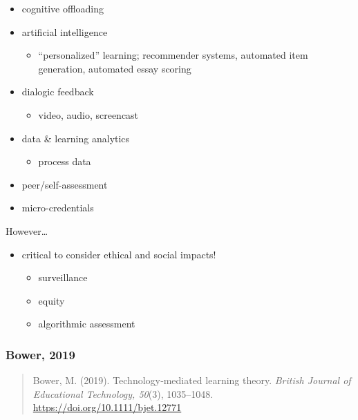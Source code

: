 \documentclass[
]{book}
\providecommand{\tightlist}{%
  \setlength{\itemsep}{0pt}\setlength{\parskip}{0pt}}
\begin{document}
\begin{itemize}
\tightlist
\item
  cognitive offloading\\
\item
  artificial intelligence

  \begin{itemize}
  \tightlist
  \item
    ``personalized'' learning; recommender systems, automated item generation, automated essay scoring\\
  \end{itemize}
\item
  dialogic feedback

  \begin{itemize}
  \tightlist
  \item
    video, audio, screencast\\
  \end{itemize}
\item
  data \& learning analytics

  \begin{itemize}
  \tightlist
  \item
    process data\\
  \end{itemize}
\item
  peer/self-assessment
\item
  micro-credentials
\end{itemize}

However\ldots{}

\begin{itemize}
\tightlist
\item
  critical to consider ethical and social impacts!

  \begin{itemize}
  \tightlist
  \item
    surveillance
  \item
    equity
  \item
    algorithmic assessment
  \end{itemize}
\end{itemize}

\hypertarget{bower-2019}{%
\subsubsection*{Bower, 2019}\label{bower-2019}}

\begin{quote}
Bower, M. (2019). Technology‐mediated learning theory. \emph{British Journal of Educational Technology, 50}(3), 1035--1048. \url{https://doi.org/10.1111/bjet.12771}
\end{quote}
\end{document}
